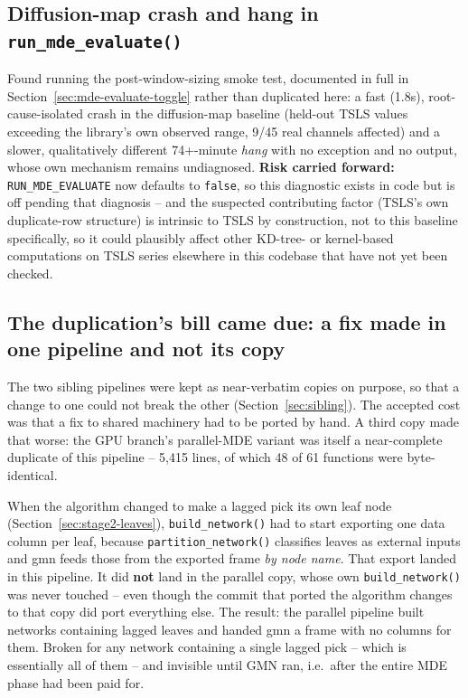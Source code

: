 \documentclass[11pt]{article}
\begin{document}
\subsection{Diffusion-map crash and hang in \texttt{run\_mde\_evaluate()}}
Found running the post-window-sizing smoke test, documented in full in Section~\ref{sec:mde-evaluate-toggle} rather than duplicated here: a fast (1.8s), root-cause-isolated crash in the diffusion-map baseline (held-out TSLS values exceeding the library's own observed range, 9/45 real channels affected) and a slower, qualitatively different 74+-minute \emph{hang} with no exception and no output, whose own mechanism remains undiagnosed. \textbf{Risk carried forward:} \texttt{RUN\_MDE\_EVALUATE} now defaults to \texttt{false}, so this diagnostic exists in code but is off pending that diagnosis -- and the suspected contributing factor (TSLS's own duplicate-row structure) is intrinsic to TSLS by construction, not to this baseline specifically, so it could plausibly affect other KD-tree- or kernel-based computations on TSLS series elsewhere in this codebase that have not yet been checked.

\subsection{The duplication's bill came due: a fix made in one pipeline and not its copy}
\label{sec:history-duplication}
The two sibling pipelines were kept as near-verbatim copies on purpose, so that a change to one could not break the other (Section~\ref{sec:sibling}). The accepted cost was that a fix to shared machinery had to be ported by hand. A third copy made that worse: the GPU branch's parallel-MDE variant was itself a near-complete duplicate of this pipeline -- 5{,}415 lines, of which 48 of 61 functions were byte-identical.

When the algorithm changed to make a lagged pick its own leaf node (Section~\ref{sec:stage2-leaves}), \texttt{build\_network()} had to start exporting one data column per leaf, because \texttt{partition\_network()} classifies leaves as external inputs and gmn feeds those from the exported frame \emph{by node name}. That export landed in this pipeline. It did \textbf{not} land in the parallel copy, whose own \texttt{build\_network()} was never touched -- even though the commit that ported the algorithm changes to that copy did port everything else. The result: the parallel pipeline built networks containing lagged leaves and handed gmn a frame with no columns for them. Broken for any network containing a single lagged pick -- which is essentially all of them -- and invisible until GMN ran, i.e.\ after the entire MDE phase had been paid for.
\end{document}
